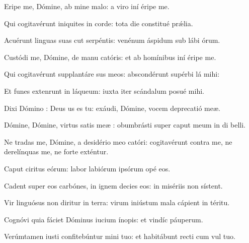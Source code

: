 \item Eripe me, Dómine, ab mine malo:\psstar{} a viro iní éripe me.

\item Qui cogitavérunt iniquites in corde:\psstar{} tota die constitué prǽlia.

\item Acuérunt linguas suas cut serpéntis:\psstar{} venénum áspidum sub lábi órum.

\item Custódi me, Dómine, de manu catóris:\psstar{} et ab homínibus iní éripe me.

\item Qui cogitavérunt supplantáre sus meos:\psstar{} abscondérunt supérbi lá mihi:

\item Et funes extenrunt in láqueum:\psstar{} iuxta iter scándalum posué mihi.

\item Dixi Dómino : Deus us es tu:\psstar{} exáudi, Dómine, vocem deprecatió meæ.

\item Dómine, Dómine, virtus satis meæ :\psstar{} obumbrásti super caput meum in di belli.

\item Ne tradas me, Dómine, a desidério meo catóri:\psstar{} cogitavérunt contra me, ne derelínquas me, ne forte exténtur.

\item Caput ciritus eórum:\psstar{} labor labiórum ipsórum opé eos.

\item Cadent super eos carbónes,\pscross{} in ignem decies eos:\psstar{} in misériis non sístent.

\item Vir linguósus non diritur in terra:\psstar{} virum iniústum mala cápient in téritu.

\item Cognóvi quia fáciet Dóminus iucium ínopis:\psstar{} et vindíc páuperum.

\item Verúmtamen iusti confitebúntur mini tuo:\psstar{} et habitábunt recti cum vul tuo.
